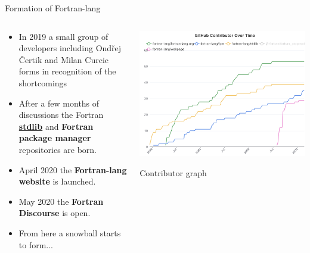 \documentclass[aspectratio=169]{beamer}
\begin{document}
\begin{frame}{Formation of Fortran-lang}


\begin{columns}[T] %
\begin{column}{.38\textwidth}
{\footnotesize
\begin{itemize}
    \item In 2019 a small group of developers including Ond\v{r}ej \v{C}ertik and Milan Curcic forms in recognition of the shortcomings
    \item After a few months of discussions the Fortran \textbf{\url{stdlib}} and \textbf{Fortran package manager} repositories are born.
    \item April 2020 the \textbf{Fortran-lang website} is launched.
    \item May 2020 the \textbf{Fortran Discourse} is open.
    \item From here a snowball starts to form...
\end{itemize}}
\end{column}%
\hfill%
\begin{column}{.58\textwidth}
    \centering
    \includegraphics[width=\textwidth]{contributor_graph}
    \caption{Contributor graph}
\end{column}%
\end{columns}

\end{frame}
\end{document}
